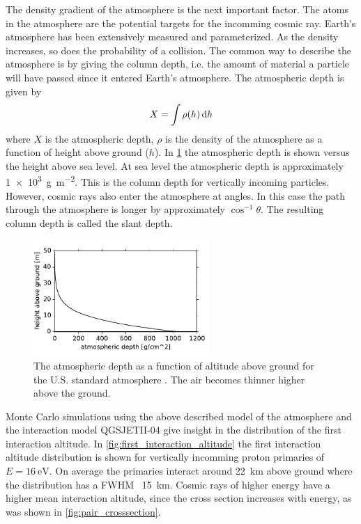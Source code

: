 The density gradient of the atmosphere is the next important factor. The atoms in the atmosphere are the potential targets for the incomming cosmic ray. Earth's atmosphere has been extensively measured and parameterized. As the density increases, so does the probability of a collision. The common way to describe the atmosphere is by giving the column depth, i.e. the amount of material a particle will have passed since it entered Earth's atmosphere. The atmospheric depth is given by
%
\begin{equation}
    X = \int \rho(h) \mathop{}\!\mathrm{d} h
\end{equation}
%
where $X$ is the atmospheric depth, $\rho$ is the density of the atmosphere as a function of height above ground ($h$). In \cref{fig:atmospheric_depth} the atmospheric depth is shown versus the height above sea level. At sea level the atmospheric depth is approximately \SI{1e3}{\gram\per\meter\squared}. This is the column depth for vertically incoming particles. However, cosmic rays also enter the atmosphere at angles. In this case the path through the atmosphere is longer by approximately $\cos^{-1} \theta$. The resulting column depth is called the slant depth.

\begin{figure}
    \centering
    \includegraphics[width=0.6\textwidth]
                    {plots/cosmic-rays/atmospheric_depth}
    \caption{The atmospheric depth as a function of altitude above ground for the U.S. standard atmosphere \cite{heck2013corsika}. The air becomes thinner higher above the ground.}
    \label{fig:atmospheric_depth}
\end{figure}

Monte Carlo simulations using the above described model of the atmosphere and the interaction model QGSJETII-04 give insight in the distribution of the first interaction altitude. In \cref{fig:first_interaction_altitude} the first interaction altitude distribution is shown for vertically incomming proton primaries of $E = \SI{16}{\eV}$. On average the primaries interact around \SI{22}{\kilo\meter} above ground where the distribution has a FWHM ~\SI{15}{\kilo\meter}. Cosmic rays of higher energy have a higher mean interaction altitude, since the cross section increases with energy, as was shown in \cref{fig:pair_crosssection}.

